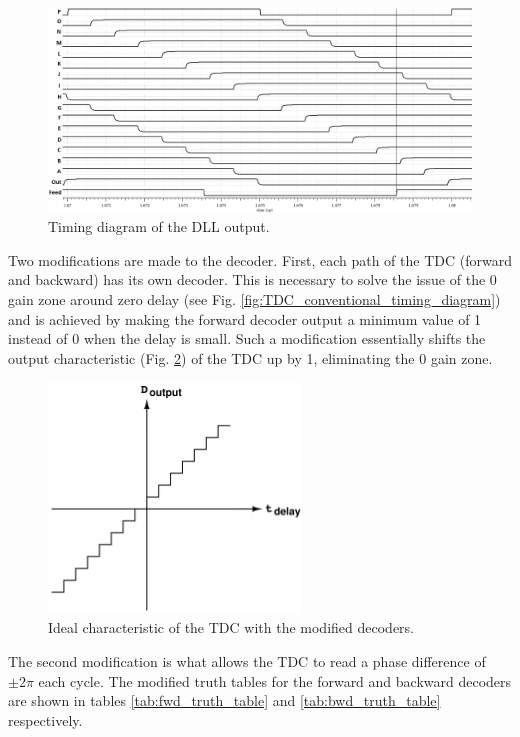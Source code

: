 \begin{figure}[H]
    \centering
    \includegraphics[width=1\textwidth]{figures/DLL_TRAN.png}
    \caption{Timing diagram of the DLL output.}
    \label{fig:DLL_output_TRAN}
\end{figure}

Two modifications are made to the decoder. First, each path of the TDC (forward and backward) has its own decoder. This is necessary to solve the issue of the 0 gain zone around zero delay
(see Fig. \ref{fig:TDC_conventional_timing_diagram}) and is achieved by making the forward decoder output a minimum value of 1 instead of 0 when the delay is small. Such a modification essentially shifts
the output characteristic (Fig. \ref{fig:TDC_shifted_characteristic}) of the TDC up by 1, eliminating the 0 gain zone.

\begin{figure}[H]
    \centering
    \includegraphics[width=0.6\textwidth]{figures/TDC_shifted_characteristic.png}
    \caption{Ideal characteristic of the TDC with the modified decoders.}
    \label{fig:TDC_shifted_characteristic}
\end{figure}

The second modification is what allows the TDC to read a phase difference of $\pm2\pi$ each cycle. The modified truth tables for the forward and backward decoders are shown in tables
\ref{tab:fwd_truth_table} and \ref{tab:bwd_truth_table} respectively. 

